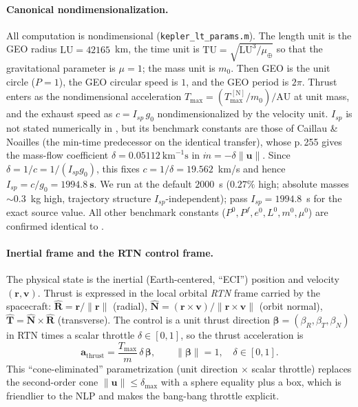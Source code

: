 \documentclass[11pt]{article}
\newcommand{\file}[1]{\texttt{\small #1}}
\newcommand{\rv}{\mathbf{r}}
\newcommand{\vv}{\mathbf{v}}
\newcommand{\bv}{\boldsymbol{\beta}}
\newcommand{\uv}{\mathbf{u}}
\newcommand{\Rf}{\hat{\mathbf{R}}}
\newcommand{\Tf}{\hat{\mathbf{T}}}
\newcommand{\Nf}{\hat{\mathbf{N}}}
\newcommand{\Tmax}{T_{\max}}
\begin{document}
\paragraph{Canonical nondimensionalization.} All computation is nondimensional
(\file{kepler\_lt\_params.m}). The length unit is the GEO radius
$\mathrm{LU}=42165$~km, the time unit is $\mathrm{TU}=\sqrt{\mathrm{LU}^3/\mu_\oplus}$
so that the gravitational parameter is $\mu=1$; the mass unit is $m_0$. Then GEO
is the unit circle ($P=1$), the GEO circular speed is $1$, and the GEO period is
$2\pi$. Thrust enters as the nondimensional acceleration
$\Tmax = (\Tmax^{\,\mathrm{[N]}}/m_0)/\mathrm{AU}$ at unit mass, and the exhaust
speed as $c = I_{sp}\,g_0$ nondimensionalized by the velocity unit. $I_{sp}$ is
not stated numerically in \cite{ghm2004}, but its benchmark constants are those
of Caillau \& Noailles \cite{cn2001} (the min-time predecessor on the identical
transfer), whose p.\,255 gives the mass-flow coefficient
$\delta = 0.05112~\mathrm{km}^{-1}\mathrm{s}$ in $\dot m = -\delta\lVert
\mathbf{u}\rVert$. Since $\delta = 1/c = 1/(I_{sp}g_0)$, this fixes
$c = 1/\delta = 19.562$~km/s and hence $I_{sp} = c/g_0 = \mathbf{1994.8~s}$. We
run at the default $2000$~s ($0.27\%$ high; absolute masses $\sim0.3$~kg high,
trajectory structure $I_{sp}$-independent); pass $I_{sp}=1994.8$~s for the exact
source value. All other benchmark constants ($P^0,P^f,e^0,L^0,m^0,\mu^0$) are
confirmed identical to \cite{cn2001}.

\paragraph{Inertial frame and the RTN control frame.} The physical state is the
inertial (Earth-centered, ``ECI'') position and velocity $(\rv,\vv)$. Thrust is
expressed in the local orbital \emph{RTN} frame carried by the spacecraft:
$\Rf=\rv/\lVert\rv\rVert$ (radial), $\Nf=(\rv\times\vv)/\lVert\rv\times\vv\rVert$
(orbit normal), $\Tf=\Nf\times\Rf$ (transverse). The control is a unit thrust
direction $\bv=(\beta_R,\beta_T,\beta_N)$ in RTN times a scalar throttle
$\delta\in[0,1]$, so the thrust acceleration is
\begin{equation}
\mathbf{a}_{\mathrm{thrust}} = \frac{\Tmax}{m}\,\delta\,\bv,
\qquad \lVert\bv\rVert=1,\quad \delta\in[0,1].
\label{eq:athrust}
\end{equation}
This ``cone-eliminated'' parametrization (unit direction $\times$ scalar
throttle) replaces the second-order cone $\lVert\uv\rVert\le\delta_{\max}$ with a
sphere equality plus a box, which is friendlier to the NLP and makes the
bang-bang throttle explicit.
\end{document}
